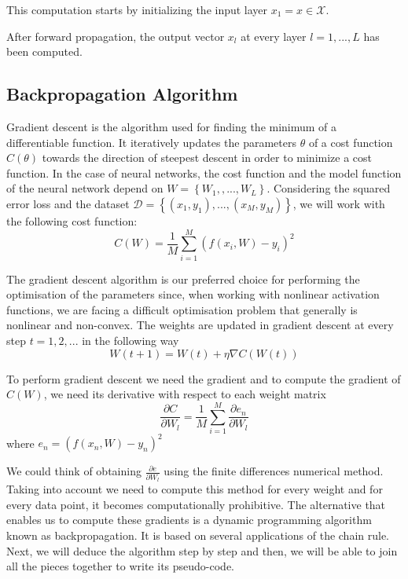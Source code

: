 This computation starts by initializing the input layer $x_1 = x \in \mathcal{X}$. 

After forward propagation, the output vector $x_l$ at every layer $l=1,...,L$ has been computed. 

\subsection{Backpropagation Algorithm}
Gradient descent is the algorithm used for finding the minimum of a differentiable function. It iteratively updates the parameters $\theta$ of a cost function $C(\theta)$ towards the direction of steepest descent in order to minimize a cost function. In the case of neural networks, the cost function and the model function of the neural network depend on $W = \left\lbrace W_1, ,..., W_L\right\rbrace$. Considering the squared error loss and the dataset $\mathcal{D}=\left\lbrace (x_1,y_1),...,(x_M,y_M)\right\rbrace$, we will work with the following cost function:
\begin{equation}
    C(W)=\frac{1}{M} \sum_{i=1}^M (f(x_i,W)-y_i)^2
\end{equation}

The gradient descent algorithm is our preferred choice for performing the optimisation of the parameters since, when working with nonlinear activation functions, we are facing a difficult optimisation problem that generally is nonlinear and non-convex. The weights are updated in gradient descent at every step $t=1,2,...$ in the following way
\begin{equation}
    W(t+1)=W(t) + \eta \nabla C(W(t))
\end{equation}

To perform gradient descent we need the gradient and to compute the gradient of $C(W)$, we need its derivative with respect to each weight matrix
$$\frac{\partial C}{\partial W_l} = \frac{1}{M}\sum_{i=1}^M \frac{\partial e_n}{\partial W_l}$$
where $e_n=(f(x_n,W)-y_n)^2$

We could think of obtaining $\frac{\partial e}{\partial W_l}$ using the finite differences numerical method. Taking into account we need to compute this method for every weight and for every data point, it becomes computationally prohibitive. The alternative that enables us to compute these gradients is a dynamic programming algorithm known as backpropagation. It is based on several applications of the chain rule. Next, we will deduce the algorithm step by step and then, we will be able to join all the pieces together to write its pseudo-code.

